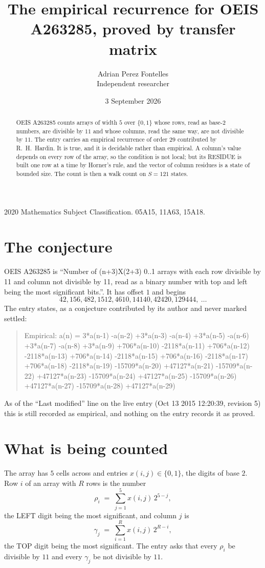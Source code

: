 \documentclass[11pt,a4paper]{article}
\title{The empirical recurrence for OEIS A263285, proved by transfer matrix}
\author{Adrian Perez Fontelles\\ \small Independent researcher}
\date{3 September 2026}
\theoremstyle{plain}
\theoremstyle{definition}
\begin{document}
\maketitle

\begin{abstract}
OEIS A263285 counts arrays of width $5$ over $\{0,1\}$ whose rows, read as base-$2$
numbers, are divisible by $11$ and whose columns, read the same way, are not divisible by
$11$. The entry carries an empirical recurrence of order $29$ contributed by
R.~H.~Hardin. It is true, and it is decidable rather than empirical. A column's value depends on
every row of the array, so the condition is not local; but its RESIDUE is built one row at a
time by Horner's rule, and the vector of column residues is a state of bounded size. The count
is then a walk count on $S=121$ states.
\end{abstract}

\noindent\small 2020 Mathematics Subject Classification. 05A15, 11A63, 15A18.\normalsize

\section{The conjecture}

OEIS A263285 is ``Number of (n+3)X(2+3) 0..1 arrays with each row divisible by 11 and column not divisible by 11, read as a binary number with top and left being the most significant bits.''. It has offset $1$ and begins
\[
42, 156, 482, 1512, 4610, 14140, 42420, 129444,\ \dots
\]
The entry states, as a conjecture contributed by its author and never marked settled:
\begin{quote}
Empirical: a(n) = 3*a(n-1) -a(n-2) +3*a(n-3) -a(n-4) +3*a(n-5) -a(n-6) +3*a(n-7) -a(n-8) +3*a(n-9) +706*a(n-10) -2118*a(n-11) +706*a(n-12) -2118*a(n-13) +706*a(n-14) -2118*a(n-15) +706*a(n-16) -2118*a(n-17) +706*a(n-18) -2118*a(n-19) -15709*a(n-20) +47127*a(n-21) -15709*a(n-22) +47127*a(n-23) -15709*a(n-24) +47127*a(n-25) -15709*a(n-26) +47127*a(n-27) -15709*a(n-28) +47127*a(n-29)
\end{quote}
As of the ``Last modified'' line on the live entry (Oct 13 2015 12:20:39, revision 5) this is still
recorded as empirical, and nothing on the entry records it as proved.

\section{What is being counted}

The array has $5$ cells across and entries $x(i,j)\in\{0,1\}$, the digits of
base $2$. Row $i$ of an array with $R$ rows is the number
\[
\rho_i\;=\;\sum_{j=1}^{5}x(i,j)\,2^{5-j} ,
\]
the LEFT digit being the most significant, and column $j$ is
\[
\gamma_j\;=\;\sum_{i=1}^{R}x(i,j)\,2^{R-i} ,
\]
the TOP digit being the most significant. The entry asks that every $\rho_i$ be divisible by
$11$ and every $\gamma_j$ be not divisible by $11$.
\end{document}
